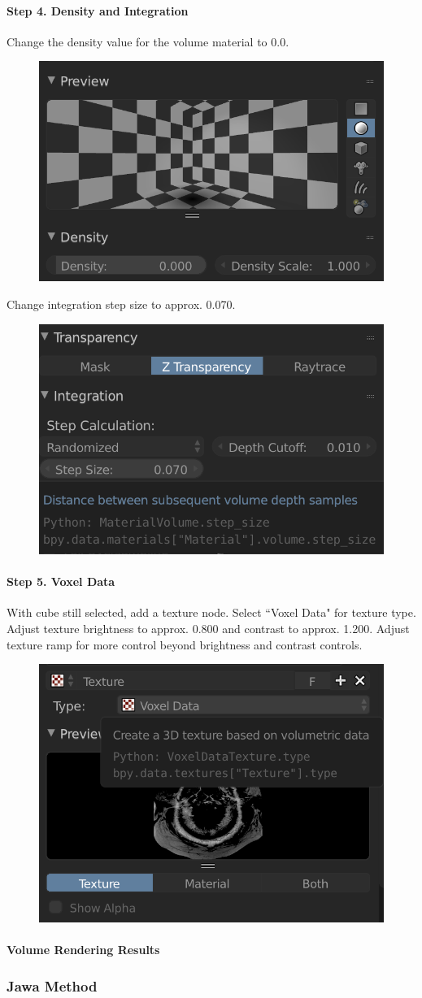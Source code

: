 \paragraph{Step 4. Density and Integration}
Change the density value for the volume material to 0.0.
\begin{figure}[H]
  \centering
  \includegraphics[width=0.5\linewidth]{img/density.png}
  \label{fig:resultsCubeDensity}
\end{figure}

Change integration step size to approx. 0.070.
\begin{figure}[H]
  \centering
  \includegraphics[width=0.5\linewidth]{img/integration.png}
  \label{fig:resultsCubeIntegration}
\end{figure}

\paragraph{Step 5. Voxel Data}
With cube still selected, add a texture node. Select ``Voxel Data" for texture type. Adjust texture brightness to approx. 0.800 and contrast to approx. 1.200. Adjust texture ramp for more control beyond brightness and contrast controls.
\begin{figure}[H]
  \centering
  \includegraphics[width=0.5\linewidth]{img/voxel.png}
  \label{fig:resultsCubeVoxel}
\end{figure}

\paragraph{Volume Rendering Results}



\subsubsection{Jawa Method}